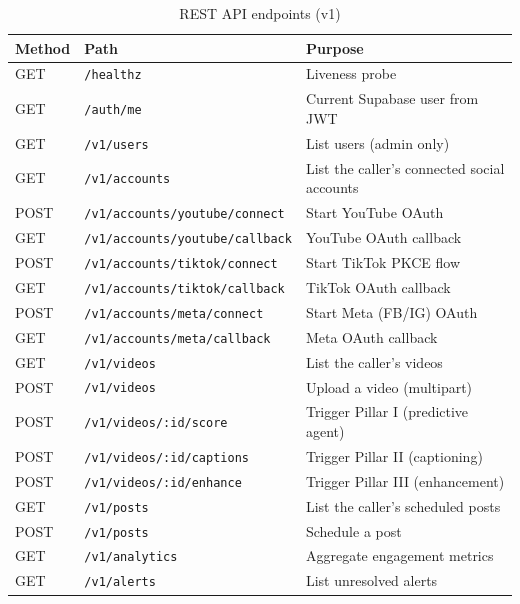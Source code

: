 \begin{table}[H]
\centering
\caption{REST API endpoints (v1)}
\label{tab:routes}
\small
\begin{tabular}{l l p{8.5cm}}
\toprule
\textbf{Method} & \textbf{Path} & \textbf{Purpose} \\
\midrule
GET    & \texttt{/healthz}                              & Liveness probe \\
GET    & \texttt{/auth/me}                              & Current Supabase user from JWT \\
GET    & \texttt{/v1/users}                             & List users (admin only) \\
GET    & \texttt{/v1/accounts}                          & List the caller's connected social accounts \\
POST   & \texttt{/v1/accounts/youtube/connect}          & Start YouTube OAuth \\
GET    & \texttt{/v1/accounts/youtube/callback}         & YouTube OAuth callback \\
POST   & \texttt{/v1/accounts/tiktok/connect}           & Start TikTok PKCE flow \\
GET    & \texttt{/v1/accounts/tiktok/callback}          & TikTok OAuth callback \\
POST   & \texttt{/v1/accounts/meta/connect}             & Start Meta (FB/IG) OAuth \\
GET    & \texttt{/v1/accounts/meta/callback}            & Meta OAuth callback \\
GET    & \texttt{/v1/videos}                            & List the caller's videos \\
POST   & \texttt{/v1/videos}                            & Upload a video (multipart) \\
POST   & \texttt{/v1/videos/:id/score}                  & Trigger Pillar I (predictive agent) \\
POST   & \texttt{/v1/videos/:id/captions}               & Trigger Pillar II (captioning) \\
POST   & \texttt{/v1/videos/:id/enhance}                & Trigger Pillar III (enhancement) \\
GET    & \texttt{/v1/posts}                             & List the caller's scheduled posts \\
POST   & \texttt{/v1/posts}                             & Schedule a post \\
GET    & \texttt{/v1/analytics}                         & Aggregate engagement metrics \\
GET    & \texttt{/v1/alerts}                            & List unresolved alerts \\
\bottomrule
\end{tabular}
\end{table}

